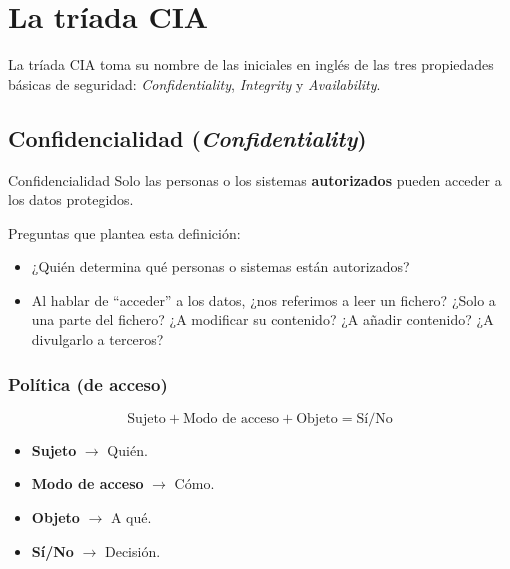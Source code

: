 \documentclass[11pt,a4paper]{report}
\begin{document}
\section{La tríada CIA}

La tríada CIA toma su nombre de las iniciales en inglés de las tres propiedades básicas de seguridad: \emph{Confidentiality}, \emph{Integrity} y \emph{Availability}.

\begin{center}
\end{center}

\subsection{Confidencialidad (\emph{Confidentiality})}

\begin{definicion}{Confidencialidad}
Solo las personas o los sistemas \textbf{autorizados} pueden acceder a los datos protegidos.
\end{definicion}

Preguntas que plantea esta definición:
\begin{itemize}
  \item ¿Quién determina qué personas o sistemas están autorizados?
  \item Al hablar de ``acceder'' a los datos, ¿nos referimos a leer un fichero? ¿Solo a una parte del fichero? ¿A modificar su contenido? ¿A añadir contenido? ¿A divulgarlo a terceros?
\end{itemize}

\subsubsection*{Política (de acceso)}

\begin{importante}
\[
\text{Sujeto} + \text{Modo de acceso} + \text{Objeto} = \text{Sí/No}
\]
\begin{itemize}
  \item \textbf{Sujeto} $\to$ Quién.
  \item \textbf{Modo de acceso} $\to$ Cómo.
  \item \textbf{Objeto} $\to$ A qué.
  \item \textbf{Sí/No} $\to$ Decisión.
\end{itemize}
\end{importante}
\end{document}
